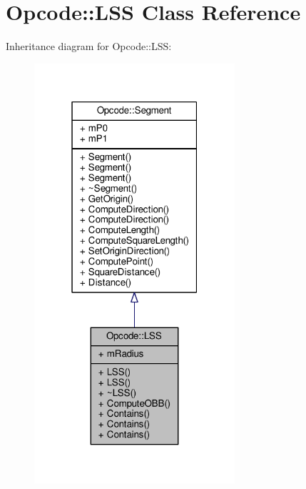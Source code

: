 \hypertarget{classOpcode_1_1LSS}{}\section{Opcode\+:\+:L\+SS Class Reference}
\label{classOpcode_1_1LSS}


Inheritance diagram for Opcode\+:\+:L\+SS\+:
\nopagebreak
\begin{figure}[H]
\begin{center}
\leavevmode
\includegraphics[width=211pt]{d6/d7f/classOpcode_1_1LSS__inherit__graph}
\end{center}
\end{figure}



